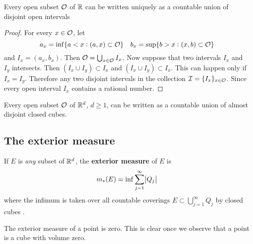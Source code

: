 \documentclass[11pt]{article}
\begin{document}
\begin{theorem}[]
Every open subset \(\mathcal{O}\) of \(\mathbb{R}\) can be written uniquely as a countable
union of disjoint open intervals
\end{theorem}
\begin{proof}
For every \(x\in\mathcal{O}\), let
\begin{equation*}
a_x=\inf\{a<x:(a,x)\subset\mathcal{O}\}\quad b_x=\sup\{b>x:(x,b)\subset\mathcal{O}\}
\end{equation*}
and \(I_x=(a_x,b_x)\). Then \(\mathcal{O}=\bigcup_{x\in\mathcal{O}}I_x\). Now suppose that
two intervals \(I_x\) and \(I_y\) intersects. Then \((I_x\cup I_y)\subset I_x\) and
\((I_x\cup I_y)\subset I_x\). This can happen only if \(I_x=I_y\). Therefore any
two disjoint intervals in the collection \(\mathcal{I}=\{I_x\}_{x\in\mathcal{O}}\). Since
every open interval \(I_x\) contains a rational number.
\end{proof}

\begin{theorem}[]
\label{thm1.4}
Every open subset \(\mathcal{O}\) of \(\mathbb{R}^d\), \(d\ge 1\), can be written as a countable
union of almost disjoint closed cubes.
\end{theorem}
\subsection{The exterior measure}
\label{sec:orgd577f35}
\begin{definition}[]
If \(E\) is \emph{any} subset of \(\mathbb{R}^d\), the \textbf{exterior measure} of \(E\) is
\begin{equation*}
m_*(E)=\inf \displaystyle\sum_{j=1}^\infty\abs{Q_j}
\end{equation*}
   where the infimum is taken over all countable coverings
   \(E\subset\bigcup_{j=1}^\infty Q_j\) by closed cubes
.
\end{definition}
\begin{examplle}[]
The exterior measure of a point is zero. This is clear once we observe that a
point is a cube with volume zero.
\end{examplle}
\end{document}
